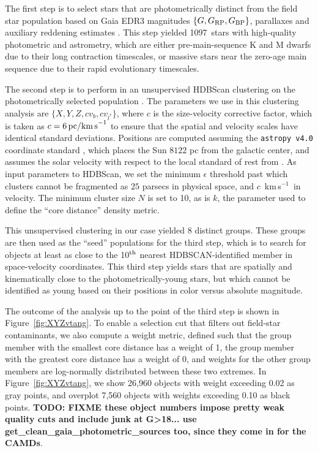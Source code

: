 \documentclass[12pt,twocolumn,linenumbers]{aastex63}
\newcommand{\npms}{1097} %
\newcommand{\kms}{\,km\,s$^{-1}$}
\begin{document}
The first step is to select stars that are photometrically distinct
from the field star population based on Gaia EDR3 magnitudes $\{G,
G_{\rm RP}, G_{\rm BP}\}$, parallaxes and auxiliary reddening
estimates \citep{lallement_gaia-2mass_2019}.  This step yielded \npms\
stars with high-quality photometric and astrometry, which are either
pre-main-sequence K and M dwarfs due to their long contraction
timescales, or massive stars near the zero-age main sequence due to
their rapid evolutionary timescales.

The second step is to perform in an unsupervised HDBScan
clustering on the photometrically selected population
\citep{campello_hierarchical_2015,mcinnes_hdbscan_2017}.  The
parameters we use in this clustering analysis are $\{ X, Y, Z, c v_b,
c v_{l^*} \} $, where $c$ is the size-velocity corrective factor,
which is taken as $c=6\,{\rm pc / km\,s}^{-1}$ to ensure that the
spatial and velocity scales have identical standard deviations.
Positions are computed assuming the \texttt{astropy v4.0} coordinate
standard \citep{astropy_2018}, which places the Sun $8122$ pc from the
galactic center, and assumes the solar velocity with respect to the
local standard of rest from \citet{schonrich_local_2010}.  As input
parameters to HDBScan, we set the minimum $\epsilon$ threshold past
which clusters cannot be fragmented as $25$ parsecs in physical space,
and $c$ \kms\ in velocity.  The minimum cluster size $N$ is set to 10,
as is $k$, the parameter used to define the ``core distance'' density
metric. 

This unsupervised clustering in our case yielded 8 distinct groups.
These groups are then used as the ``seed'' populations for the third
step, which is to search for objects at least as close to the 10$^{\rm
th}$ nearest HDBSCAN-identified member in space-velocity coordinates.
This third step yields stars that are spatially and kinematically
close to the photometrically-young stars, but which cannot be
identified as young based on their positions in color versus absolute
magnitude.

The outcome of the analysis up to the point of the third step is shown
in Figure~\ref{fig:XYZvtang}.  To enable a selection cut that filters
out field-star contaminants, we also compute a weight metric, defined
such that the group member with the smallest core distance has a
weight of 1, the group member with the greatest core distance has a
weight of 0, and weights for the other group members are log-normally
distributed between these two extremes.  In Figure~\ref{fig:XYZvtang},
we show 26{,}960 objects with weight exceeding 0.02 as gray points,
and overplot 7{,}560 objects with weights exceeding 0.10 as black
points.  {\bf TODO: FIXME these object numbers impose pretty weak
quality cuts and include junk at G>18...  use
get\_clean\_gaia\_photometric\_sources too, since they come in for the
CAMDs}.
\end{document}

